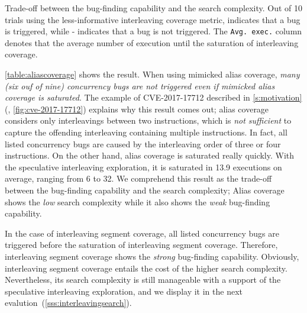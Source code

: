 %
\begin{table}[t]
  \small
  \centering
  
  \caption{Trade-off between the bug-finding capability and the search
    complexity. Out of 10 trials using the less-informative
    interleaving coverage metric, \checkmark\xspace indicates that a
    bug is triggered, while - indicates that a bug is not
    triggered. The \texttt{Avg. exec.}  column denotes that the
    average number of execution until the saturation of interleaving
    coverage.}
  \label{table:aliascoverage}
\end{table}
%
\autoref{table:aliascoverage} shows the result.
%
When using mimicked alias coverage, \textit{many (six ouf of nine)
  concurrency bugs are not triggered even if mimicked alias coverage
  is saturated}.
%
The example of CVE-2017-17712 described in \autoref{s:motivation}
(\ie, \autoref{fig:cve-2017-17712}) explains why this result comes
out; alias coverage considers only interleavings between two
instructions, which is \textit{not sufficient} to capture the
offending interleaving containing multiple instructions. In fact, all
listed concurrency bugs are caused by the interleaving order of three
or four instructions.
%
On the other hand, alias coverage is saturated really quickly. With
the speculative interleaving exploration, it is saturated in 13.9
executions on average, ranging from 6 to 32.
%
We comprehend this result as the trade-off between the bug-finding
capability and the search complexity; Alias coverage shows the
\textit{low} search complexity while it also shows the \textit{weak}
bug-finding capability.
%



In the case of interleaving segment coverage, all listed concurrency
bugs are triggered before the saturation of interleaving segment
coverage.  Therefore, interleaving segment coverage shows the
\textit{strong} bug-finding capability.
%
Obviously, interleaving segment coverage entails the cost of the
higher search complexity. Nevertheless, its search complexity is still
manageable with a support of the speculative interleaving exploration,
and we display it in the next
evalution~(\autoref{sss:interleavingsearch}).






